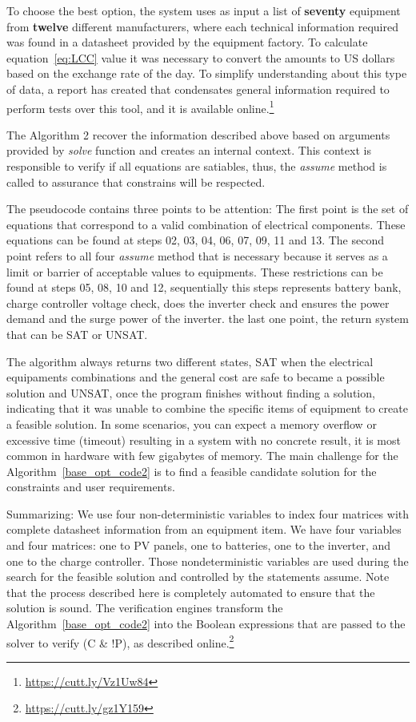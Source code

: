 \documentclass[10pt,journal,compsoc]{IEEEtran}
\begin{document}
To choose the best option, the system uses as input a list of \textbf{seventy} equipment from \textbf{twelve} different manufacturers, where each technical information required was found in a datasheet provided by the equipment factory. To calculate equation~\ref{eq:LCC} value it was necessary to convert the amounts to US dollars based on the exchange rate of the day. To simplify understanding about this type of data, a report has created that condensates general information required to perform tests over this tool, and it is available online.\footnote{\url{https://cutt.ly/Vz1Uw84}}

The Algorithm 2 recover the information described above based on arguments provided by \textit{solve} function and creates an internal context. This context is responsible to verify if all equations are satiables, thus, the \textit{assume} method is called to assurance that constrains will be respected.

The pseudocode contains three points to be attention: The first point is the set of equations that correspond to a valid combination of electrical components. These equations can be found at steps 02, 03, 04, 06, 07, 09, 11 and 13. The second point refers to all four \textit{assume} method that is necessary because it serves as a limit or barrier of acceptable values to equipments. These restrictions can be found at steps 05, 08, 10 and 12, sequentially this steps represents battery bank, charge controller voltage check, does the inverter check and ensures the power demand and the surge power of the inverter. the last one point, the return system that can be SAT or UNSAT. 

The algorithm always returns two different states, SAT when the electrical equipaments combinations and the general cost are safe to became a possible solution and  UNSAT, once the program finishes without finding a solution, indicating that it was unable to combine the specific items of equipment to create a feasible solution. In some scenarios, you can expect a memory overflow or excessive time (timeout) resulting in a system with no concrete result, it is most common in hardware with few gigabytes of memory. The main challenge for the Algorithm~\ref{base_opt_code2} is to find a feasible candidate solution for the constraints and user requirements.

\color{black}
Summarizing: We use four non-deterministic variables to index four matrices with complete datasheet information from an equipment item. We have four variables and four matrices: one to PV panels, one to batteries, one to the inverter, and one to the charge controller. Those nondeterministic variables are used during the search for the feasible solution and controlled by the statements assume. Note that the process described here is completely automated to ensure that the solution is sound. The verification engines transform the Algorithm~\ref{base_opt_code2} into the Boolean expressions that are passed to the solver to verify (C \& !P), as described online.\footnote{\url{https://cutt.ly/gz1Y159}}
\end{document}
